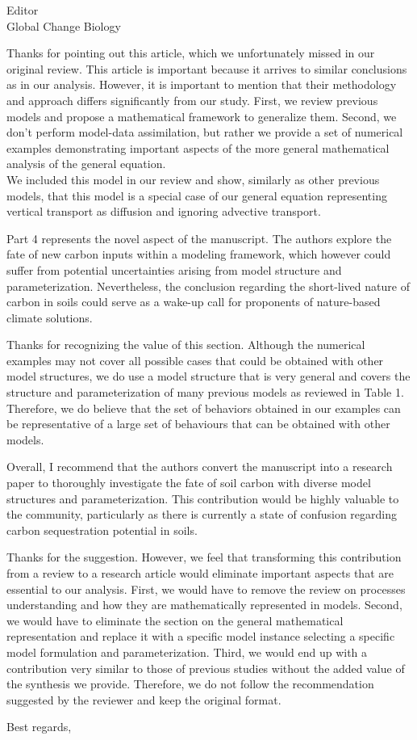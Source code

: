 \documentclass[11pt]{bgcletter}
\newcommand{\answer}[1] {
{\color{cyan} #1}
}
\begin{document}
\begin{letter}{Editor\\
   Global Change Biology
}
\answer{Thanks for pointing out this article, which we unfortunately missed in our original review. This article is important because it arrives to similar conclusions as in our analysis. However, it is important to mention that their methodology and approach differs significantly from our study. First, we review previous models and propose a mathematical framework to generalize them. Second, we don't perform model-data assimilation, but rather we provide a set of numerical examples demonstrating important aspects of the more general mathematical analysis of the general equation. \\ We included this model in our review and show, similarly as other previous models, that this model is a special case of our general equation representing vertical transport as diffusion and ignoring advective transport. }

Part 4 represents the novel aspect of the manuscript. The authors explore the fate of new carbon inputs within a modeling framework, which however could suffer from potential uncertainties arising from model structure and parameterization. Nevertheless, the conclusion regarding the short-lived nature of carbon in soils could serve as a wake-up call for proponents of nature-based climate solutions.

\answer{Thanks for recognizing the value of this section. Although the numerical examples may not cover all possible cases that could be obtained with other model structures, we do use a model structure that is very general and covers the structure and parameterization of many previous models as reviewed in Table 1. Therefore, we do believe that the set of behaviors obtained in our examples can be representative of a large set of behaviours that can be obtained with other models.}

Overall, I recommend that the authors convert the manuscript into a research paper to thoroughly investigate the fate of soil carbon with diverse model structures and parameterization. This contribution would be highly valuable to the community, particularly as there is currently a state of confusion regarding carbon sequestration potential in soils.

\answer{Thanks for the suggestion. However, we feel that transforming this contribution from a review to a research article would eliminate important aspects that are essential to our analysis. First, we would have to remove the review on processes understanding and how they are mathematically represented in models. Second, we would have to eliminate the section on the general mathematical representation and replace it with a specific model instance selecting a specific model formulation and parameterization. Third, we would end up with a contribution very similar to those of previous studies without the added value of the synthesis we provide. Therefore, we do not follow the recommendation suggested by the reviewer and keep the original format.}

 \closing{Best regards,} 
 \end{letter}

 
\end{document}
